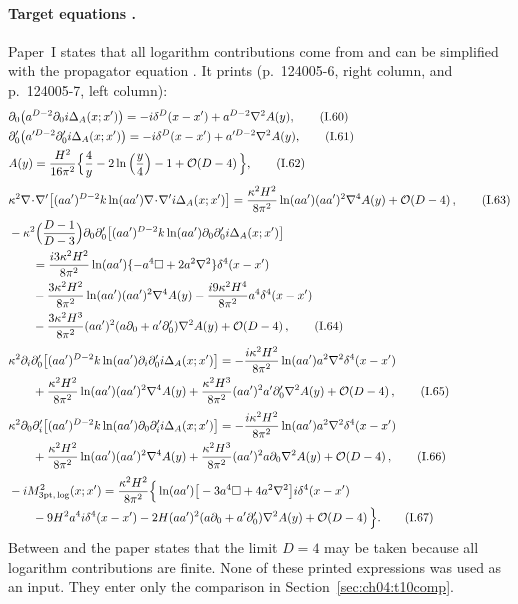 \paragraph{Target equations \tP.}
Paper~I states that all logarithm contributions come from  and can be simplified with the propagator equation .
It prints (p.~124005-6, right column, and p.~124005-7, left column):
\begin{align*}
&\partial_0\big(a^{D-2}\partial_0 i\Delta_A(x;x')\big)=-i\delta^D(x-x')+a^{D-2}\nabla^2A(y),\tag{I.60}\\
&\partial'_0\big(a'^{D-2}\partial'_0 i\Delta_A(x;x')\big)=-i\delta^D(x-x')+a'^{D-2}\nabla^2A(y),\tag{I.61}\\
&A(y)=\frac{H^2}{16\pi^2}\Big\{\frac4y-2\ln\Big(\frac y4\Big)-1+\order{D-4}\Big\},\tag{I.62}\\[3pt]
&\kappa^2\nabla\!\cdot\!\nabla'\big[(aa')^{D-2}k\ln(aa')\nabla\!\cdot\!\nabla' i\Delta_A(x;x')\big]
=\frac{\kappa^2H^2}{8\pi^2}\ln(aa')(aa')^2\nabla^4A(y)+\order{D-4},\tag{I.63}\\[3pt]
&-\kappa^2\Big(\frac{D-1}{D-3}\Big)\partial_0\partial'_0\big[(aa')^{D-2}k\ln(aa')\partial_0\partial'_0 i\Delta_A(x;x')\big]\notag\\
&\qquad=\frac{i3\kappa^2H^2}{8\pi^2}\ln(aa')\{-a^4\square+2a^2\nabla^2\}\delta^4(x-x')\notag\\
&\qquad-\frac{3\kappa^2H^2}{8\pi^2}\ln(aa')(aa')^2\nabla^4A(y)-\frac{i9\kappa^2H^4}{8\pi^2}a^4\delta^4(x-x')\notag\\
&\qquad-\frac{3\kappa^2H^3}{8\pi^2}(aa')^2(a\partial_0+a'\partial'_0)\nabla^2A(y)+\order{D-4},\tag{I.64}\\[3pt]
&\kappa^2\partial_i\partial'_0\big[(aa')^{D-2}k\ln(aa')\partial_i\partial'_0 i\Delta_A(x;x')\big]
=-\frac{i\kappa^2H^2}{8\pi^2}\ln(aa')a^2\nabla^2\delta^4(x-x')\notag\\
&\qquad+\frac{\kappa^2H^2}{8\pi^2}\ln(aa')(aa')^2\nabla^4A(y)+\frac{\kappa^2H^3}{8\pi^2}(aa')^2a'\partial'_0\nabla^2A(y)+\order{D-4},\tag{I.65}\\[3pt]
&\kappa^2\partial_0\partial'_i\big[(aa')^{D-2}k\ln(aa')\partial_0\partial'_i i\Delta_A(x;x')\big]
=-\frac{i\kappa^2H^2}{8\pi^2}\ln(aa')a^2\nabla^2\delta^4(x-x')\notag\\
&\qquad+\frac{\kappa^2H^2}{8\pi^2}\ln(aa')(aa')^2\nabla^4A(y)+\frac{\kappa^2H^3}{8\pi^2}(aa')^2a\partial_0\nabla^2A(y)+\order{D-4},\tag{I.66}\\[3pt]
&-iM^2_{\rm 3pt,\,log}(x;x')=\frac{\kappa^2H^2}{8\pi^2}\Big\{\ln(aa')\big[-3a^4\square+4a^2\nabla^2\big]i\delta^4(x-x')\notag\\
&\qquad-9H^2a^4i\delta^4(x-x')-2H(aa')^2(a\partial_0+a'\partial'_0)\nabla^2A(y)+\order{D-4}\Big\}.\tag{I.67}
\end{align*}
Between  and  the paper states that the limit $D=4$ may be taken because all logarithm contributions are finite.
None of these printed expressions was used as an input. They enter only the comparison in Section~\ref{sec:ch04:t10comp}.

